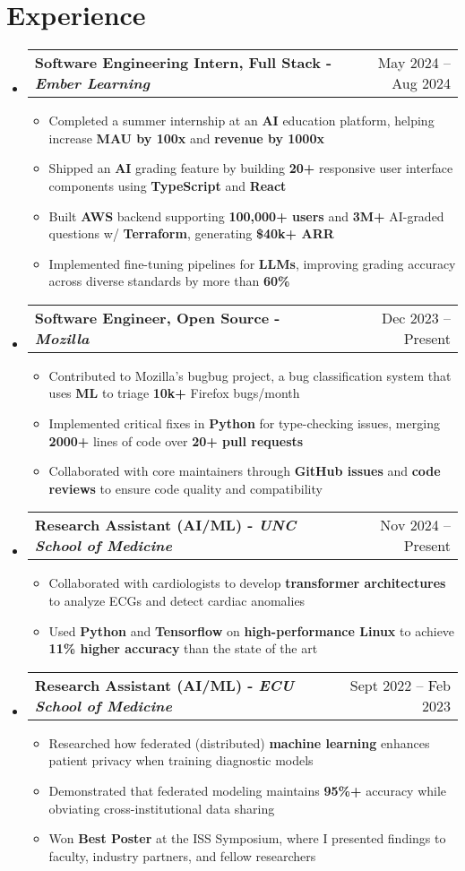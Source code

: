 \documentclass[letterpaper,11pt]{article}
\makeatletter
\newcommand{\resumeItem}[1]{
  \item\small{
    {#1 \vspace{-2pt}}}
}
\newcommand{\resumeSubheading}[2]{
  \vspace{-2pt}\item
    \begin{tabular*}{0.97\textwidth}[t]{l@{\extracolsep{\fill}}r}
      \textbf{#1} & #2 \\
    \end{tabular*}
    \vspace{-7pt}
}
\newcommand{\resumeSubHeadingListStart}{\begin{itemize}[leftmargin=0.15in, label={}]}
\newcommand{\resumeSubHeadingListEnd}{\end{itemize}}
\newcommand{\resumeItemListStart}{\begin{itemize}[leftmargin=0.15in]}
\newcommand{\resumeItemListEnd}{\end{itemize}\vspace{-5pt}}
\makeatother
\begin{document}
\section{Experience}
  \resumeSubHeadingListStart
    \resumeSubheading
      {\textbf{Software Engineering Intern, Full Stack} - \textit{Ember Learning}}{May 2024 -- Aug 2024}
      \resumeItemListStart
        \resumeItem{Completed a summer internship at an \textbf{AI} education platform, helping increase \textbf{MAU by 100x} and \textbf{revenue by 1000x}}
        \resumeItem{Shipped an \textbf{AI} grading feature by building \textbf{20+} responsive user interface components using \textbf{TypeScript} and \textbf{React}}
        \resumeItem{Built \textbf{AWS} backend supporting \textbf{100,000+ users} and \textbf{3M+} AI-graded questions w/ \textbf{Terraform}, generating \textbf{\$40k+ ARR}}
        \resumeItem{Implemented fine-tuning pipelines for \textbf{LLMs}, improving grading accuracy across diverse standards by more than \textbf{60\%}}
      \resumeItemListEnd
      \resumeSubheading
      {\textbf{Software Engineer, Open Source} - \textit{Mozilla}}{Dec 2023 -- Present}
      \resumeItemListStart
        \resumeItem{Contributed to Mozilla's bugbug project, a bug classification system that uses \textbf{ML} to triage \textbf{10k+} Firefox bugs/month} 
        \resumeItem{Implemented critical fixes in \textbf{Python} for type-checking issues, merging \textbf{2000+} lines of code over \textbf{20+ pull requests}}
        \resumeItem{Collaborated with core maintainers through \textbf{GitHub issues} and \textbf{code reviews} to ensure code quality and compatibility}
      \resumeItemListEnd
      \resumeSubheading
      {\textbf{Research Assistant (AI/ML)} - \textit{UNC School of Medicine}}{ Nov 2024 -- Present}
      \resumeItemListStart
        \resumeItem{Collaborated with cardiologists to develop \textbf{transformer architectures} to analyze ECGs and detect cardiac anomalies}
        \resumeItem{Used \textbf{Python} and \textbf{Tensorflow} on \textbf{high-performance Linux} to achieve \textbf{11\% higher accuracy} than the state of the art}
      \resumeItemListEnd
      \resumeSubheading
      {\textbf{Research Assistant (AI/ML)} - \textit{ECU School of Medicine}}{Sept 2022 -- Feb 2023}
      \resumeItemListStart
        \resumeItem{Researched how federated (distributed) \textbf{machine learning} enhances patient privacy when training diagnostic models}
        \resumeItem{Demonstrated that federated modeling maintains \textbf{95\%+} accuracy while obviating cross-institutional data sharing}
        \resumeItem{Won \textbf{Best Poster} at the ISS Symposium, where I presented findings to faculty, industry partners, and fellow researchers}
      \resumeItemListEnd
  \resumeSubHeadingListEnd
\end{document}
